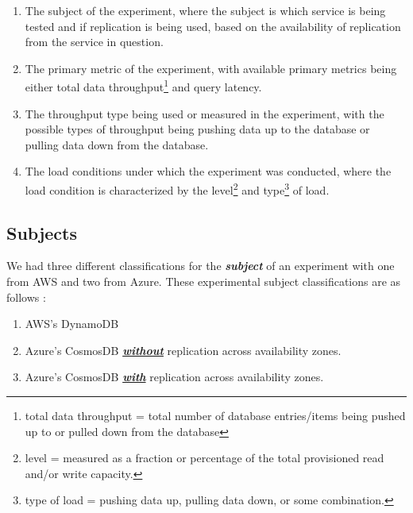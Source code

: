\vspace{0.1in}
\begin{spacing}{1.2}
\begin{enumerate}[label=\large{\textbf{\arabic*}):}]
	\item The subject of the experiment, where the subject is which service is being tested and if replication is being used, based on the availability of replication from the service in question.
	\vspace{0.05in}
	\item The primary metric of the experiment, with available primary metrics being either total data throughput\footnote{total data throughput = total number of database entries/items being pushed up to or pulled down from the database} and query latency.
	\vspace{0.05in}
	\item The throughput type being used or measured in the experiment, with the possible types of throughput being pushing data up to the database or pulling data down from the database.
	\vspace{0.05in}
	\item The load conditions under which the experiment was conducted, where the load condition is characterized by the level\footnote{level = measured as a fraction or percentage of the total provisioned read and/or write capacity.} and type\footnote{type of load = pushing data up, pulling data down, or some combination.} of load.
\end{enumerate}
\end{spacing}



\subsection{Subjects}

We had three different classifications for the \emph{\textbf{subject}} of an experiment with one from AWS and two from Azure.  These experimental subject classifications are as follows : 

\vspace{0.1in}
\begin{spacing}{1.2}
\begin{enumerate}[label=\Large{\textbf{\Alph*}):}]
	\item AWS's DynamoDB
	\vspace{0.05in}
	\item Azure's CosmosDB \textbf{\underline{\emph{without}}} replication across availability zones.
	\vspace{0.05in}
	\item Azure's CosmosDB \textbf{\underline{\emph{with}}} replication across availability zones.
\end{enumerate}
\end{spacing}


